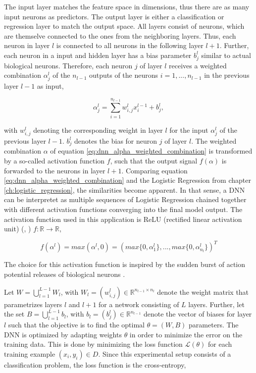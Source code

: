 The input layer matches the feature space in dimensions, thus there are
as many input neurons as predictors. The output layer is either a classification or regression 
layer to match the output space. All layers consist of neurons, which are themselve connected to the ones from the neighboring layers. 
Thus, each neuron in layer $ l $  is 
connected to all neurons in the following layer $ l + 1 $. Further, each neuron in a input and hidden layer has a bias parameter $b_{j}^{l}$ similar to actual biological neurons.
Therefore, each neuron $j$ of layer $l$ receives a weighted combination $ \alpha_{j}^{l}  $ of the
$ n_{l - 1} $ outputs of the neurons $i = 1, ..., n_{l - 1} $ in the previous layer $ l - 1 $ as input,

\begin{equation}
    \alpha_{j}^{l} = \sum_{ i=1 }^{ n_{l - 1} } w_{i, j}^{l} x_{i}^{l - 1} + b_{j}^{l},
    \label{eq:dnn_alpha_weighted_combination}
\end{equation}

with $ w_{i, j}^{l} $ denoting the corresponding weight in layer $l$ for the input $ \alpha_{j}^{l} $ of the previous layer $l - 1$.
$ b_{j}^{l} $ denotes the bias for neuron $j$ of layer $l$. 
The weighted combination $ \alpha $ of equation \ref{eq:dnn_alpha_weighted_combination} is transformed by
a so-called activation function $ f $, such that the output signal $ f(\alpha) $ is forwarded to the neurons
in layer $ l + 1 $. Comparing equation \ref{eq:dnn_alpha_weighted_combination} and the Logistic Regression from chapter \ref{ch:logistic_regression}, 
the similarities become apparent. In that sense, a DNN can be interpretet as multiple sequences of Logistic Regression
chained together with different activation functions converging into the final model output.
The activation function used in this application is ReLU (rectified linear activation unit) (\cite{arora2018relu}, \cite{berner2019reluDerivative})
$ f: \mathbb{R} \rightarrow \mathbb{R} $,

\begin{equation}
    f( \alpha^{l} ) = max( \alpha^{l}, 0 ) = ( max\{0, \alpha^{l}_{1}\}, ..., max\{0, \alpha^{l}_{  n_{l}  }\} )^{T}
    \label{eq:relu}
\end{equation}

The choice for this activation function is inspired by the sudden burst of action potential releases of biological neurons \cite{zhang2019actionPotential}.

Let $ W = \bigcup_{l=1}^{L - 1} W_{l} $, with $W_{l} = (w_{i, j}^{l}) \in \mathbb{R}^{ n_{l - 1} \times n_{l} } $ denote the
weight matrix that parametrizes layers $l$ and $l + 1$ for a network consisting of $L$ layers. 
Further, let the set $ B = \bigcup_{l=1}^{L - 1} b_{l}  $,
with $ b_{l} = ( b_{j}^{l} ) \in \mathbb{R}^{ n_{l - 1} } $ denote the vector of biases for layer $l$ such that the objective is to find
the optimal $ \theta = (W, B) $ parameters.
The DNN is optimized by adapting weights $ \theta $ in order to minimize the error on the training data.
This is done by minimizing the loss function $\mathscr{L} (\theta)$ for each training example $(x_{i}, y_{i}) \in D$. 
Since this experimental setup consists of a classification problem, the loss function is the cross-entropy,

